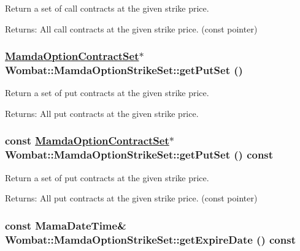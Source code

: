 Return a set of call contracts at the given strike price. 

\begin{Desc}
\item[Returns:]All call contracts at the given strike price. (const pointer) \end{Desc}
\hypertarget{classWombat_1_1MamdaOptionStrikeSet_d17cabbb0f8477a8908d2a978508fc05}{
\subsubsection[getPutSet]{\setlength{\rightskip}{0pt plus 5cm}\hyperlink{classWombat_1_1MamdaOptionContractSet}{Mamda\-Option\-Contract\-Set}$\ast$ Wombat::Mamda\-Option\-Strike\-Set::get\-Put\-Set ()}}
\label{classWombat_1_1MamdaOptionStrikeSet_d17cabbb0f8477a8908d2a978508fc05}


Return a set of put contracts at the given strike price. 

\begin{Desc}
\item[Returns:]All put contracts at the given strike price. \end{Desc}
\hypertarget{classWombat_1_1MamdaOptionStrikeSet_4d25037ee3e7cea46aea4eb277418392}{
\subsubsection[getPutSet]{\setlength{\rightskip}{0pt plus 5cm}const \hyperlink{classWombat_1_1MamdaOptionContractSet}{Mamda\-Option\-Contract\-Set}$\ast$ Wombat::Mamda\-Option\-Strike\-Set::get\-Put\-Set () const}}
\label{classWombat_1_1MamdaOptionStrikeSet_4d25037ee3e7cea46aea4eb277418392}


Return a set of put contracts at the given strike price. 

\begin{Desc}
\item[Returns:]All put contracts at the given strike price. (const pointer) \end{Desc}
\hypertarget{classWombat_1_1MamdaOptionStrikeSet_a696f4da1cb8fffb6267e1185b345f99}{
\subsubsection[getExpireDate]{\setlength{\rightskip}{0pt plus 5cm}const Mama\-Date\-Time\& Wombat::Mamda\-Option\-Strike\-Set::get\-Expire\-Date () const}}
\label{classWombat_1_1MamdaOptionStrikeSet_a696f4da1cb8fffb6267e1185b345f99}


